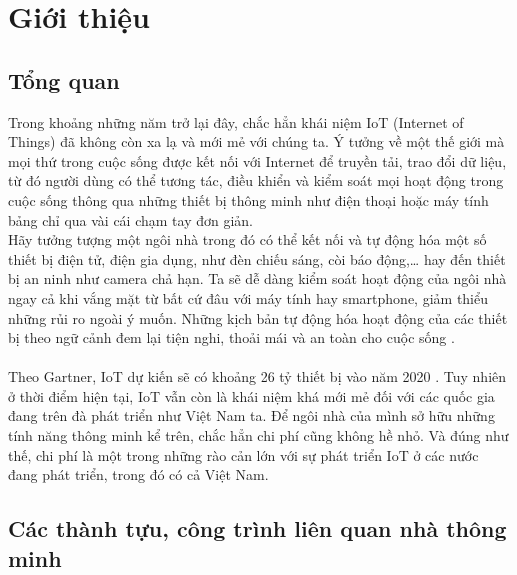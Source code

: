 \documentclass[12pt,a4paper,oneside]{extbook}
\begin{document}
\renewcommand{\listfigurename}{Danh mục hình ảnh}
\listoffigures
{}

\mainmatter

\chapter{Giới thiệu}

\section{Tổng quan}
Trong khoảng những năm trở lại đây, chắc hẳn khái niệm IoT (Internet of Things) đã không còn xa lạ và mới mẻ với chúng ta. Ý tưởng về một thế giới mà mọi thứ trong cuộc sống được kết nối với Internet để truyền tải, trao đổi dữ liệu, từ đó người dùng có thể tương tác, điều khiển và kiểm soát mọi hoạt động trong cuộc sống thông qua những thiết bị thông minh như điện thoại hoặc máy tính bảng chỉ qua vài cái chạm tay đơn giản.\\

\noindent
Hãy tưởng tượng một ngôi nhà trong đó có thể kết nối và tự động hóa một số thiết bị điện tử, điện gia dụng, như đèn chiếu sáng, còi báo động,\dots\hspace{0mm} hay đến thiết bị an ninh như camera chả hạn. Ta sẽ dễ dàng kiểm soát hoạt động của ngôi nhà ngay cả khi vắng mặt từ bất cứ đâu với máy tính hay smartphone, giảm thiểu những rủi ro ngoài ý muốn. Những kịch bản tự động hóa hoạt động của các thiết bị theo ngữ cảnh đem lại tiện nghi, thoải mái và an toàn cho cuộc sống \cite{smarthome-trend}.\\\\
Theo Gartner, IoT dự kiến sẽ có khoảng 26 tỷ thiết bị vào năm 2020 \cite{gartner}. Tuy nhiên ở thời điểm hiện tại, IoT vẫn còn là khái niệm khá mới mẻ đối với các quốc gia đang trên đà phát triển như Việt Nam ta. Để ngôi nhà của mình sở hữu những tính năng thông minh kể trên, chắc hẳn chi phí cũng không hề nhỏ. Và đúng như thế, chi phí là một trong những rào cản lớn với sự phát triển IoT ở các nước đang phát triển, trong đó có cả Việt Nam.

\section{Các thành tựu, công trình liên quan nhà thông minh}
\end{document}
